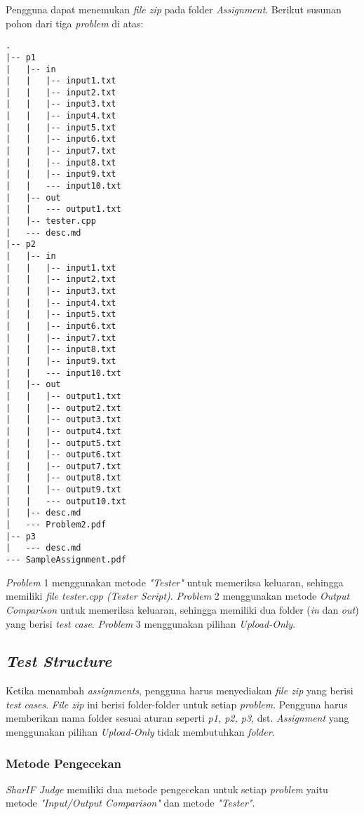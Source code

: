 Pengguna dapat menemukan \textit{file zip} pada folder \textit{Assignment}. Berikut susunan pohon dari tiga \textit{problem} di atas:

\begin{lstlisting}[basicstyle=\ttfamily, frame=single,
columns=fullflexible, keepspaces=true, breaklines=true, label=ls:8]
.
|-- p1
|   |-- in
|   |   |-- input1.txt
|   |   |-- input2.txt
|   |   |-- input3.txt
|   |   |-- input4.txt
|   |   |-- input5.txt
|   |   |-- input6.txt
|   |   |-- input7.txt
|   |   |-- input8.txt
|   |   |-- input9.txt
|   |   --- input10.txt
|   |-- out
|   |   --- output1.txt
|   |-- tester.cpp
|   --- desc.md
|-- p2
|   |-- in
|   |   |-- input1.txt
|   |   |-- input2.txt
|   |   |-- input3.txt
|   |   |-- input4.txt
|   |   |-- input5.txt
|   |   |-- input6.txt
|   |   |-- input7.txt
|   |   |-- input8.txt
|   |   |-- input9.txt
|   |   --- input10.txt
|   |-- out
|   |   |-- output1.txt
|   |   |-- output2.txt
|   |   |-- output3.txt
|   |   |-- output4.txt
|   |   |-- output5.txt
|   |   |-- output6.txt
|   |   |-- output7.txt
|   |   |-- output8.txt
|   |   |-- output9.txt
|   |   --- output10.txt
|   |-- desc.md
|   --- Problem2.pdf
|-- p3
|   --- desc.md
--- SampleAssignment.pdf
\end{lstlisting}

\textit{Problem} 1 menggunakan metode \textit{"Tester"} untuk memeriksa keluaran, sehingga memiliki \textit{file tester.cpp (Tester Script)}. \textit{Problem} 2 menggunakan metode \textit{Output Comparison} untuk memeriksa keluaran, sehingga memiliki dua folder (\textit{in} dan \textit{out}) yang berisi \textit{test case}. \textit{Problem} 3 menggunakan pilihan \textit{Upload-Only}.

\subsection{\textit{Test Structure}}
\label{subsec:test_structure}
Ketika menambah \textit{assignments}, pengguna harus menyediakan \textit{file zip} yang berisi \textit{test cases}. \textit{File zip} ini berisi folder-folder untuk setiap \textit{problem}. Pengguna harus memberikan nama folder sesuai aturan seperti \textit{p1, p2, p3}, dst. \textit{Assignment} yang menggunakan pilihan \textit{Upload-Only} tidak membutuhkan \textit{folder}.

\subsubsection{Metode Pengecekan}
\label{subsubsec:metode_pengecekan}
\textit{SharIF Judge} memiliki dua metode pengecekan untuk setiap \textit{problem} yaitu metode \textit{"Input/Output Comparison"} dan metode \textit{"Tester"}.

